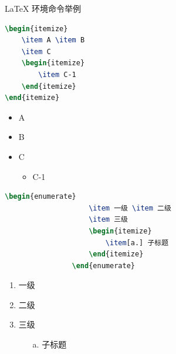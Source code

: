 \documentclass{beamer}
\begin{document}
	\begin{frame}[fragile]{\LaTeX{} 环境命令举例}
		\begin{minipage}{0.5\linewidth}
			\begin{lstlisting}[language=TeX]
\begin{itemize}
    \item A \item B
    \item C
    \begin{itemize}
        \item C-1
    \end{itemize}
\end{itemize}
\end{lstlisting}
		\end{minipage}\hspace{1cm}
		\begin{minipage}{0.3\linewidth}
			\begin{itemize}
				\item A
				\item B
				\item C
				\begin{itemize}
					\item C-1
				\end{itemize}
			\end{itemize}
		\end{minipage}
		\medskip
		\pause
		\begin{minipage}{0.5\linewidth}
			\begin{lstlisting}[language=TeX]
				\begin{enumerate}
					\item 一级 \item 二级
					\item 三级
					\begin{itemize}
						\item[a.] 子标题
					\end{itemize}
				\end{enumerate}
			\end{lstlisting}
		\end{minipage}\hspace{1cm}
		\begin{minipage}{0.3\linewidth}
			\begin{enumerate}
				\item 一级
				\item 二级
				\item 三级
				\begin{itemize}
					\item[a.] 子标题
				\end{itemize}
			\end{enumerate}
		\end{minipage}
	\end{frame}
	
\end{document}
